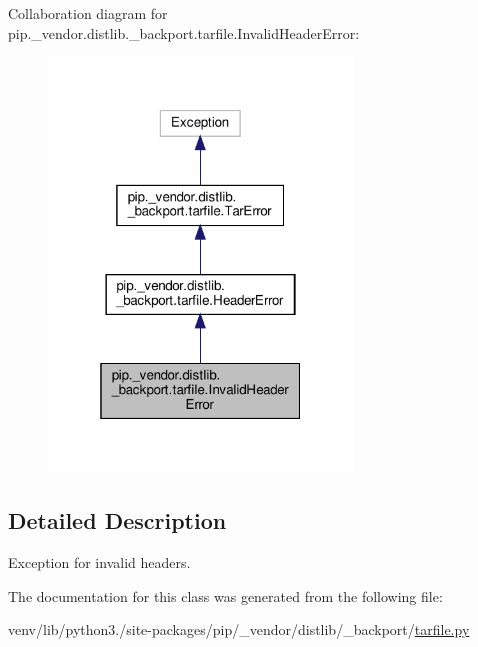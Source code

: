 Collaboration diagram for pip.\+\_\+vendor.\+distlib.\+\_\+backport.\+tarfile.\+Invalid\+Header\+Error\+:
\nopagebreak
\begin{figure}[H]
\begin{center}
\leavevmode
\includegraphics[width=229pt]{classpip_1_1__vendor_1_1distlib_1_1__backport_1_1tarfile_1_1InvalidHeaderError__coll__graph}
\end{center}
\end{figure}


\subsection{Detailed Description}
\begin{DoxyVerb}Exception for invalid headers.\end{DoxyVerb}
 

The documentation for this class was generated from the following file\+:\begin{DoxyCompactItemize}
\item 
venv/lib/python3./site-\/packages/pip/\+\_\+vendor/distlib/\+\_\+backport/\hyperlink{tarfile_8py}{tarfile.\+py}\end{DoxyCompactItemize}
